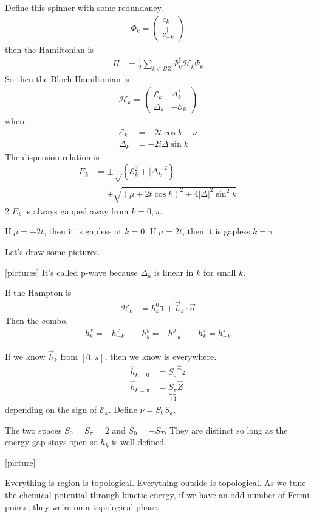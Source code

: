 Define this spinner with some redundancy.
\begin{align}
    \Phi_k =
    \begin{pmatrix}
        c_k\\
        c_{-k}^\dagger
    \end{pmatrix}
\end{align}
then the Hamiltonian is
\begin{align}
    H &=
    \frac{1}{2}\sum_{k\in BZ}
    \Psi_k^\dagger \mathcal{H}_k \Psi_k
\end{align}
So then the Bloch Hamiltonian is
\begin{align}
    \mathcal{H}_k =
    \begin{pmatrix}
        \mathcal{E}_k & \Delta_k^*\\
        \Delta_k & -\mathcal{E}_k
    \end{pmatrix}
\end{align}
where
\begin{align}
    \mathcal{E}_k &= -2t\cos k - \nu\\
    \Delta_k &= -2i\Delta\sin k
\end{align}
The dispersion relation is
\begin{align}
    E_k &= \pm
    \sqrt\left\{ \mathcal{E}_k^2 + |\Delta_k|^2 \right\}\\
    &= \pm
    \sqrt{
        (\mu + 2t\cos k)^2
        + 4|\Delta|^2\sin^2 k
    }
\end{align}2
$E_k$ is always gapped away from $k=0,\pi$.

If $\mu=-2t$,
then it is gapless at $k=0$.
If $\mu=2t$,
then it is gapless $k=\pi$

Let's draw some pictures.

[pictures]
It's called p-wave because $\Delta_k$ is linear in $k$ for small $k$.

If the Hampton is
\begin{align}
    \mathcal{H}_k &=
    h_k^0 \mathbf{1}
    + \vec{h}_k \cdot \vec{\sigma}
\end{align}
Then the combo.
\begin{align}
    h_k^x = -h_{-k}^x
    \qquad
    h_y^y = -h_{-k}^y
    \qquad
    h_k^z = h^z_{-k}
\end{align}

If we know $\vec{h}_k$ from $[0,\pi]$,
then we know is everywhere.
\begin{align}
    \hat{h}_{k=0} &= S_0 \hat^{z}\\
    \hat{h}_{k=\pi} &= \underbrace{S_{\pi}}_{\pm 1}\hat{Z}
\end{align}
depending on the sign of $\mathcal{E}_\pi$.
Define $\nu = S_0 S_\pi$.

The two spaces $S_0 = S_{\pi}=2$
and $S_0 = -S_{T}$.
They are distinct so long as the energy gap stays open so $h_k$ is well-defined.

[picture]

Everything is region is topological.
Everything outside is topological.
As we tune the chemical potential through kinetic energy,
if we have an odd number of Fermi points,
they we're on a topological phase.
